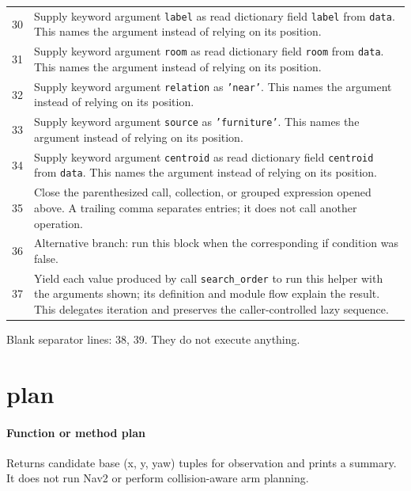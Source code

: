 \documentclass[11pt,a4paper]{book}
\begin{document}
\begin{longtable}{r p{}}
30 & Supply keyword argument \texttt{label} as read dictionary field \texttt{label} from \texttt{data}. This names the argument instead of relying on its position. \\

31 & Supply keyword argument \texttt{room} as read dictionary field \texttt{room} from \texttt{data}. This names the argument instead of relying on its position. \\

32 & Supply keyword argument \texttt{relation} as \texttt{'near'}. This names the argument instead of relying on its position. \\

33 & Supply keyword argument \texttt{source} as \texttt{'furniture'}. This names the argument instead of relying on its position. \\

34 & Supply keyword argument \texttt{centroid} as read dictionary field \texttt{centroid} from \texttt{data}. This names the argument instead of relying on its position. \\

35 & Close the parenthesized call, collection, or grouped expression opened above. A trailing comma separates entries; it does not call another operation. \\

36 & Alternative branch: run this block when the corresponding if condition was false. \\

37 & Yield each value produced by call \texttt{search\_order} to run this helper with the arguments shown; its definition and module flow explain the result. This delegates iteration and preserves the caller-controlled lazy sequence. \\

\end{longtable}

Blank separator lines: 38, 39. They do not execute anything.

\section{plan}

\paragraph{Function or method plan}
Returns candidate base (x, y, yaw) tuples for observation and prints a summary. It does not run Nav2 or perform collision-aware arm planning.
\end{document}
